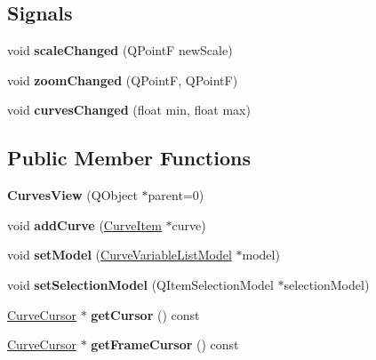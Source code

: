 \subsection*{\-Signals}
\begin{DoxyCompactItemize}
\item 
\hypertarget{class_curves_view_a7bbc3218c8fd748d08d8c46e730696f6}{
void {\bfseries scale\-Changed} (\-Q\-Point\-F new\-Scale)}
\label{class_curves_view_a7bbc3218c8fd748d08d8c46e730696f6}

\item 
\hypertarget{class_curves_view_acc57c305648c305eb00cb74f81967bb9}{
void {\bfseries zoom\-Changed} (\-Q\-Point\-F, \-Q\-Point\-F)}
\label{class_curves_view_acc57c305648c305eb00cb74f81967bb9}

\item 
\hypertarget{class_curves_view_ad0373bcc4d282d5fe0096db50bd010bc}{
void {\bfseries curves\-Changed} (float min, float max)}
\label{class_curves_view_ad0373bcc4d282d5fe0096db50bd010bc}

\end{DoxyCompactItemize}
\subsection*{\-Public \-Member \-Functions}
\begin{DoxyCompactItemize}
\item 
\hypertarget{class_curves_view_acbbebf13484fc83f29fca8d3d8227765}{
{\bfseries \-Curves\-View} (\-Q\-Object $\ast$parent=0)}
\label{class_curves_view_acbbebf13484fc83f29fca8d3d8227765}

\item 
\hypertarget{class_curves_view_a40454b99bb46fb7f6f5f75a4b8507d10}{
void {\bfseries add\-Curve} (\hyperlink{class_curve_item}{\-Curve\-Item} $\ast$curve)}
\label{class_curves_view_a40454b99bb46fb7f6f5f75a4b8507d10}

\item 
\hypertarget{class_curves_view_a4878ee665018fb2727b9c989893e8adb}{
void {\bfseries set\-Model} (\hyperlink{class_curve_variable_list_model}{\-Curve\-Variable\-List\-Model} $\ast$model)}
\label{class_curves_view_a4878ee665018fb2727b9c989893e8adb}

\item 
\hypertarget{class_curves_view_ace4a51eb407babe3390ccaf13c828dfc}{
void {\bfseries set\-Selection\-Model} (\-Q\-Item\-Selection\-Model $\ast$selection\-Model)}
\label{class_curves_view_ace4a51eb407babe3390ccaf13c828dfc}

\item 
\hypertarget{class_curves_view_ae58f96a3da476b9b8538986281c1809a}{
\hyperlink{class_curve_cursor}{\-Curve\-Cursor} $\ast$ {\bfseries get\-Cursor} () const }
\label{class_curves_view_ae58f96a3da476b9b8538986281c1809a}

\item 
\hypertarget{class_curves_view_a09001febfd075650b3dcbf543cf9a5c3}{
\hyperlink{class_curve_cursor}{\-Curve\-Cursor} $\ast$ {\bfseries get\-Frame\-Cursor} () const }
\label{class_curves_view_a09001febfd075650b3dcbf543cf9a5c3}

\end{DoxyCompactItemize}
